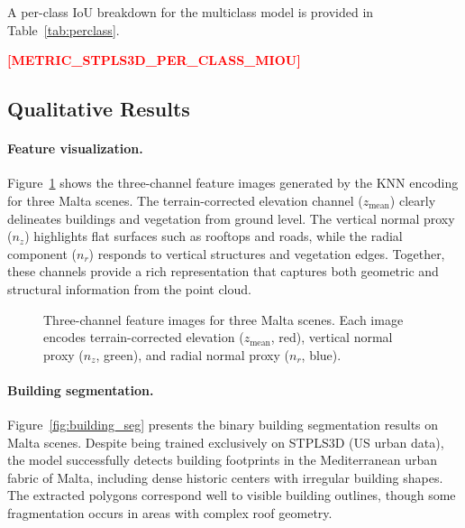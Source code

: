 \documentclass[11pt]{article}
\newcommand{\placeholder}[1]{\textcolor{red}{\textbf{[#1]}}}
\begin{document}
A per-class IoU breakdown for the multiclass model is provided in Table~\ref{tab:perclass}.

\begin{table}[t]
    \centering
    \caption{Per-class IoU on the STPLS3D validation set (multiclass model).}
    \label{tab:perclass}
    \small
    \placeholder{METRIC\_STPLS3D\_PER\_CLASS\_MIOU}
\end{table}

\subsection{Qualitative Results}
\label{sec:results_qualitative}

\paragraph{Feature visualization.}
Figure~\ref{fig:feature_maps} shows the three-channel feature images generated by the KNN encoding for three Malta scenes.
The terrain-corrected elevation channel ($z_{\text{mean}}$) clearly delineates buildings and vegetation from ground level.
The vertical normal proxy ($n_z$) highlights flat surfaces such as rooftops and roads, while the radial component ($n_r$) responds to vertical structures and vegetation edges.
Together, these channels provide a rich representation that captures both geometric and structural information from the point cloud.

\begin{figure}[t]
    \centering
    \caption{Three-channel feature images for three Malta scenes. Each image encodes terrain-corrected elevation ($z_{\text{mean}}$, red), vertical normal proxy ($n_z$, green), and radial normal proxy ($n_r$, blue).}
    \label{fig:feature_maps}
\end{figure}

\paragraph{Building segmentation.}
Figure~\ref{fig:building_seg} presents the binary building segmentation results on Malta scenes.
Despite being trained exclusively on STPLS3D (US urban data), the model successfully detects building footprints in the Mediterranean urban fabric of Malta, including dense historic centers with irregular building shapes.
The extracted polygons correspond well to visible building outlines, though some fragmentation occurs in areas with complex roof geometry.
\end{document}
